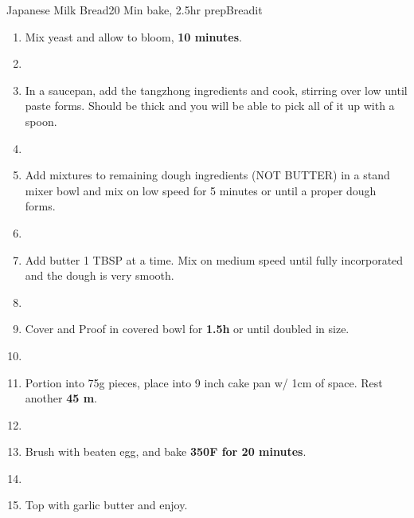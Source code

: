 \documentclass[]{mikescards}
\begin{document}
\begin{recipe}{Japanese Milk Bread}{20 Min bake, 2.5hr prep}{Breadit}
\begin{parcolumns}[colwidths={1=100pt}, rulebetween]{2}
{\begin{enumerate}
      \item Mix yeast and allow to bloom, \textbf{10 minutes}.
      \item 
      \item In a saucepan, add the tangzhong ingredients and cook, stirring over low until  paste forms. Should be thick and you will be able to pick all of it up with a spoon.
      \item 
      \item Add mixtures to remaining dough ingredients (NOT BUTTER) in a stand mixer bowl and mix on low speed for 5 minutes or until a proper dough forms.
      \item 
      \item Add butter 1 TBSP at a time. Mix on medium speed until fully incorporated and the dough is very smooth.
      \item 
      \item Cover and Proof in covered bowl for \textbf{1.5h} or until doubled in size.
      \item 
      \item Portion into 75g pieces, place into 9 inch cake pan w/ 1cm of space. Rest another \textbf{45 m}.
      \item 
      \item Brush with beaten egg, and bake \textbf{350F for 20 minutes}.
      \item 
      \item Top with garlic butter and enjoy.
    \end{enumerate}
  }
\end{parcolumns}



\end{recipe}
\end{document}
